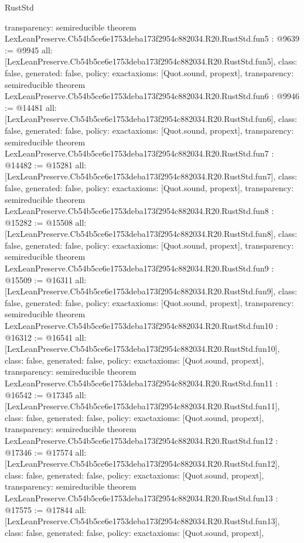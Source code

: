 \begin{lexlean}{RustStd}
\begin{coremodule}
{  transparency: semireducible
}
theorem LexLeanPreserve.Cb54b5ce6e1753deba173f2954c882034.R20.RustStd.fun5 : @9639 := @9945 {
  all: [LexLeanPreserve.Cb54b5ce6e1753deba173f2954c882034.R20.RustStd.fun5],
  class: false,
  generated: false,
  policy: exact{axioms: [Quot.sound, propext]},
  transparency: semireducible
}
theorem LexLeanPreserve.Cb54b5ce6e1753deba173f2954c882034.R20.RustStd.fun6 : @9946 := @14481 {
  all: [LexLeanPreserve.Cb54b5ce6e1753deba173f2954c882034.R20.RustStd.fun6],
  class: false,
  generated: false,
  policy: exact{axioms: [Quot.sound, propext]},
  transparency: semireducible
}
theorem LexLeanPreserve.Cb54b5ce6e1753deba173f2954c882034.R20.RustStd.fun7 : @14482 := @15281 {
  all: [LexLeanPreserve.Cb54b5ce6e1753deba173f2954c882034.R20.RustStd.fun7],
  class: false,
  generated: false,
  policy: exact{axioms: [Quot.sound, propext]},
  transparency: semireducible
}
theorem LexLeanPreserve.Cb54b5ce6e1753deba173f2954c882034.R20.RustStd.fun8 : @15282 := @15508 {
  all: [LexLeanPreserve.Cb54b5ce6e1753deba173f2954c882034.R20.RustStd.fun8],
  class: false,
  generated: false,
  policy: exact{axioms: [Quot.sound, propext]},
  transparency: semireducible
}
theorem LexLeanPreserve.Cb54b5ce6e1753deba173f2954c882034.R20.RustStd.fun9 : @15509 := @16311 {
  all: [LexLeanPreserve.Cb54b5ce6e1753deba173f2954c882034.R20.RustStd.fun9],
  class: false,
  generated: false,
  policy: exact{axioms: [Quot.sound, propext]},
  transparency: semireducible
}
theorem LexLeanPreserve.Cb54b5ce6e1753deba173f2954c882034.R20.RustStd.fun10 : @16312 := @16541 {
  all: [LexLeanPreserve.Cb54b5ce6e1753deba173f2954c882034.R20.RustStd.fun10],
  class: false,
  generated: false,
  policy: exact{axioms: [Quot.sound, propext]},
  transparency: semireducible
}
theorem LexLeanPreserve.Cb54b5ce6e1753deba173f2954c882034.R20.RustStd.fun11 : @16542 := @17345 {
  all: [LexLeanPreserve.Cb54b5ce6e1753deba173f2954c882034.R20.RustStd.fun11],
  class: false,
  generated: false,
  policy: exact{axioms: [Quot.sound, propext]},
  transparency: semireducible
}
theorem LexLeanPreserve.Cb54b5ce6e1753deba173f2954c882034.R20.RustStd.fun12 : @17346 := @17574 {
  all: [LexLeanPreserve.Cb54b5ce6e1753deba173f2954c882034.R20.RustStd.fun12],
  class: false,
  generated: false,
  policy: exact{axioms: [Quot.sound, propext]},
  transparency: semireducible
}
theorem LexLeanPreserve.Cb54b5ce6e1753deba173f2954c882034.R20.RustStd.fun13 : @17575 := @17844 {
  all: [LexLeanPreserve.Cb54b5ce6e1753deba173f2954c882034.R20.RustStd.fun13],
  class: false,
  generated: false,
  policy: exact{axioms: [Quot.sound, propext]},
}
\end{coremodule}
\end{lexlean}
